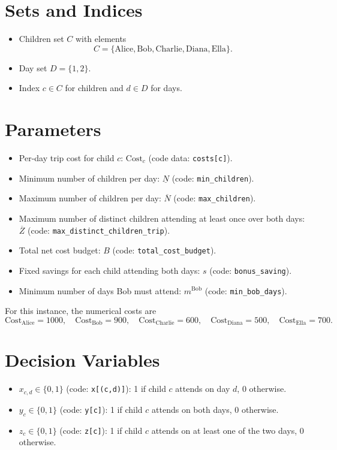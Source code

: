 \section*{Sets and Indices}

\begin{itemize}
    \item Children set $C$ with elements
    \[
    C=\{\text{Alice},\text{Bob},\text{Charlie},\text{Diana},\text{Ella}\}.
    \]
    \item Day set $D=\{1,2\}$.
    \item Index $c \in C$ for children and $d \in D$ for days.
\end{itemize}

\section*{Parameters}

\begin{itemize}
    \item Per-day trip cost for child $c$: $\mathrm{Cost}_c$ (code data: \texttt{costs[c]}).
    \item Minimum number of children per day: $\underline{N}$ (code: \texttt{min\_children}).
    \item Maximum number of children per day: $\overline{N}$ (code: \texttt{max\_children}).
    \item Maximum number of distinct children attending at least once over both days: $\overline{Z}$ (code: \texttt{max\_distinct\_children\_trip}).
    \item Total net cost budget: $B$ (code: \texttt{total\_cost\_budget}).
    \item Fixed savings for each child attending both days: $s$ (code: \texttt{bonus\_saving}).
    \item Minimum number of days Bob must attend: $m^{\text{Bob}}$ (code: \texttt{min\_bob\_days}).
\end{itemize}

For this instance, the numerical costs are
\[
\mathrm{Cost}_{\text{Alice}}=1000,\quad
\mathrm{Cost}_{\text{Bob}}=900,\quad
\mathrm{Cost}_{\text{Charlie}}=600,\quad
\mathrm{Cost}_{\text{Diana}}=500,\quad
\mathrm{Cost}_{\text{Ella}}=700.
\]

\section*{Decision Variables}

\begin{itemize}
    \item $x_{c,d} \in \{0,1\}$ (code: \texttt{x[(c,d)]}): 1 if child $c$ attends on day $d$, 0 otherwise.
    \item $y_c \in \{0,1\}$ (code: \texttt{y[c]}): 1 if child $c$ attends on both days, 0 otherwise.
    \item $z_c \in \{0,1\}$ (code: \texttt{z[c]}): 1 if child $c$ attends on at least one of the two days, 0 otherwise.
\end{itemize}

